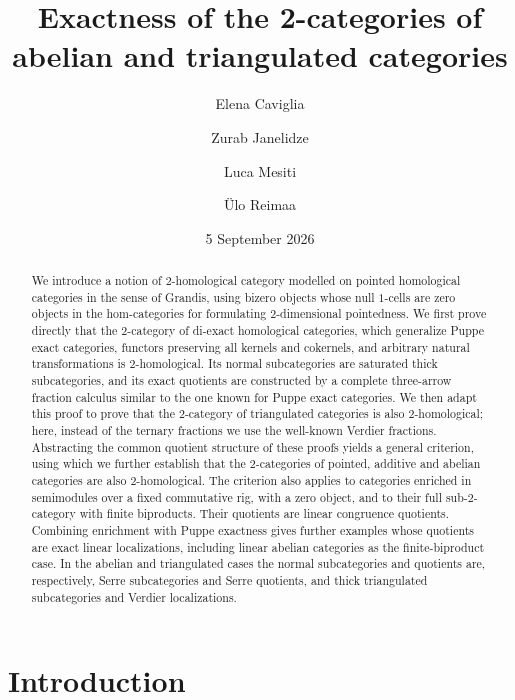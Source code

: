 \documentclass[11pt,reqno,a4paper]{amsart}
\title[Exactness of the 2-categories of abelian and triangulated categories]{Exactness of the 2-categories of abelian and triangulated categories}
\author[E. Caviglia]{Elena Caviglia}
\author[Z. Janelidze]{Zurab Janelidze}
\author[L. Mesiti]{Luca Mesiti}
\author[\"U. Reimaa]{\"Ulo Reimaa}
\date{5 September 2026}
\theoremstyle{definition}
\theoremstyle{remark}
\newcommand{\0}{\mathbf{0}}
\renewcommand{\1}{\mathbf{1}}
\begin{document}
\begin{abstract}
We introduce a notion of $2$-homological category modelled on pointed homological categories in the sense of Grandis, using bizero objects whose null $1$-cells are zero objects in the hom-categories for formulating $2$-dimensional pointedness. We first prove directly that the $2$-category of di-exact homological categories, which generalize Puppe exact categories, functors preserving all kernels and cokernels, and arbitrary natural transformations is $2$-homological. Its normal subcategories are saturated thick subcategories, and its exact quotients are constructed by a complete three-arrow fraction calculus similar to the one known for Puppe exact categories. We then adapt this proof to prove that the $2$-category of triangulated categories is also $2$-homological; here, instead of the ternary fractions we use the well-known Verdier fractions. Abstracting the common quotient structure of these proofs yields a general criterion, using which we further establish that the $2$-categories of pointed, additive and abelian categories are also $2$-homological. The criterion also applies to categories enriched in semimodules over a fixed commutative rig, with a zero object, and to their full sub-$2$-category with finite biproducts. Their quotients are linear congruence quotients. Combining enrichment with Puppe exactness gives further examples whose quotients are exact linear localizations, including linear abelian categories as the finite-biproduct case. In the abelian and triangulated cases the normal subcategories and quotients are, respectively, Serre subcategories and Serre quotients, and thick triangulated subcategories and Verdier localizations.
\end{abstract}
\maketitle

\section*{Introduction}
\end{document}
